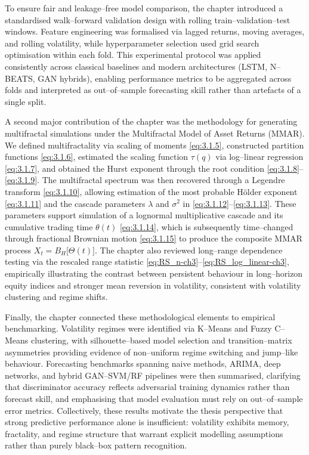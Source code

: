 \documentclass[12pt,a4paper]{report}
\numberwithin{equation}{section}
\begin{document}
To ensure fair and leakage--free model comparison, the chapter introduced a standardised walk--forward validation design with rolling train--validation--test windows. Feature engineering was formalised via lagged returns, moving averages, and rolling volatility, while hyperparameter selection used grid search optimisation within each fold. This experimental protocol was applied consistently across classical baselines and modern architectures (LSTM, N--BEATS, GAN hybrids), enabling performance metrics to be aggregated across folds and interpreted as out--of--sample forecasting skill rather than artefacts of a single split.

A second major contribution of the chapter was the methodology for generating multifractal simulations under the Multifractal Model of Asset Returns (MMAR). We defined multifractality via scaling of moments \eqref{eq:3.1.5}, constructed partition functions \eqref{eq:3.1.6}, estimated the scaling function $\tau(q)$ via log--linear regression \eqref{eq:3.1.7}, and obtained the Hurst exponent through the root condition \eqref{eq:3.1.8}--\eqref{eq:3.1.9}. The multifractal spectrum was then recovered through a Legendre transform \eqref{eq:3.1.10}, allowing estimation of the most probable H\"older exponent \eqref{eq:3.1.11} and the cascade parameters $\lambda$ and $\sigma^2$ in \eqref{eq:3.1.12}--\eqref{eq:3.1.13}. These parameters support simulation of a lognormal multiplicative cascade and its cumulative trading time $\theta(t)$ \eqref{eq:3.1.14}, which is subsequently time--changed through fractional Brownian motion \eqref{eq:3.1.15} to produce the composite MMAR process $X_t = B_H\!\big[\Theta(t)\big]$. The chapter also reviewed long--range dependence testing via the rescaled range statistic \eqref{eq:RS_n-ch3}--\eqref{eq:RS_log_linear-ch3}, empirically illustrating the contrast between persistent behaviour in long--horizon equity indices and stronger mean reversion in volatility, consistent with volatility clustering and regime shifts.

Finally, the chapter connected these methodological elements to empirical benchmarking. Volatility regimes were identified via K--Means and Fuzzy C--Means clustering, with silhouette--based model selection and transition--matrix asymmetries providing evidence of non--uniform regime switching and jump--like behaviour. Forecasting benchmarks spanning naive methods, ARIMA, deep networks, and hybrid GAN--SVM/RF pipelines were then summarised, clarifying that discriminator accuracy reflects adversarial training dynamics rather than forecast skill, and emphasising that model evaluation must rely on out--of--sample error metrics. Collectively, these results motivate the thesis perspective that strong predictive performance alone is insufficient: volatility exhibits memory, fractality, and regime structure that warrant explicit modelling assumptions rather than purely black--box pattern recognition.
\end{document}
